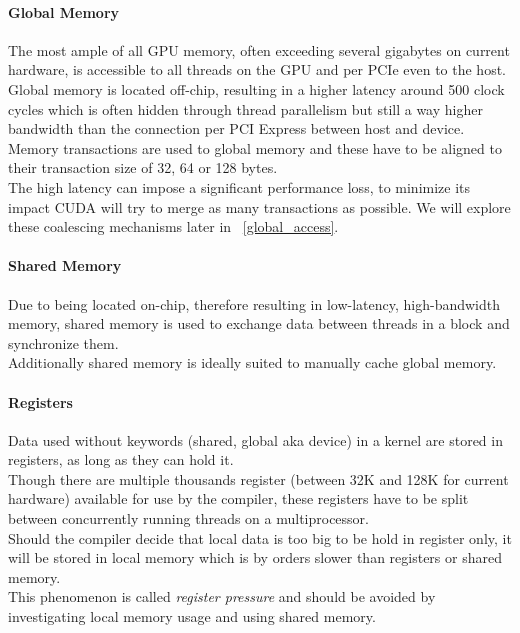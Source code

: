 \paragraph{Global Memory}
\label{hardware_global}
The most ample of all GPU memory, often exceeding several gigabytes on current hardware, is accessible to all threads on the GPU and per PCIe even to the host.\\
Global memory is located off-chip, resulting in a higher latency around 500 clock cycles which is often hidden through thread parallelism but still a way higher bandwidth than the connection per PCI Express between host and device.\\
Memory transactions are used to global memory and these have to be aligned to their transaction size of 32, 64 or 128 bytes.\\
The high latency can impose a significant performance loss, to minimize its impact CUDA will try to merge as many transactions as possible. We will explore these coalescing mechanisms later in ~\ref{global_access}.\\
\paragraph{Shared Memory}
Due to being located on-chip, therefore resulting in low-latency, high-bandwidth memory, shared memory is used to exchange data between threads in a block and synchronize them.\\
Additionally shared memory is ideally suited to manually cache global memory.\\
\paragraph{Registers}
Data used without keywords (shared, global aka device) in a kernel are stored in registers, as long as they can hold it.\\
Though there are multiple thousands register (between 32K and 128K for current hardware) available for use by the compiler,
these registers have to be split between concurrently running threads on a multiprocessor.\\
Should the compiler decide that local data is too big to be hold in register only,
it will be stored in local memory which is by orders slower than registers or shared memory.\\
This phenomenon is called \emph{register pressure} and should be avoided by investigating local memory usage
and using shared memory.\\
